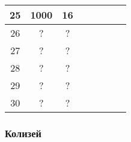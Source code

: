 \begin{longtable}[c]{|c|c|c|c|c|c|c|c|}
    \multirow{1}{*}{25} & \multirow{1}{*}{1000} & \multirow{1}{*}{16} & & & & & \\\hline
    \multirow{1}{*}{26} & \multirow{1}{*}{?} & \multirow{1}{*}{?} & & & & & \\\hline
    \multirow{1}{*}{27} & \multirow{1}{*}{?} & \multirow{1}{*}{?} & & & & & \\\hline
    \multirow{1}{*}{28} & \multirow{1}{*}{?} & \multirow{1}{*}{?} & & & & & \\\hline
    \multirow{1}{*}{29} & \multirow{1}{*}{?} & \multirow{1}{*}{?} & & & & & \\\hline
    \multirow{1}{*}{30} & \multirow{1}{*}{?} & \multirow{1}{*}{?} & & & & & \\\hline
\end{longtable}


\subsubsection{Колизей}

